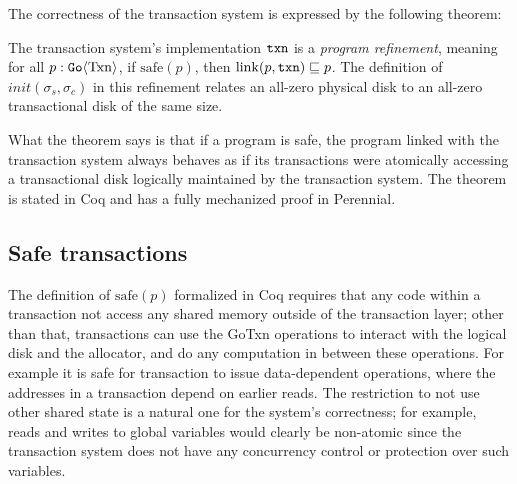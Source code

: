 %

The correctness of the transaction system is expressed by the following theorem:
%
\begin{theorem}
  The transaction system's implementation $\texttt{txn}$ is a \emph{program refinement}, meaning for
  all $p : \mathtt{Go}\langle \mathrm{Txn} \rangle$, if $\mathrm{safe}(p)$, then
  $\mathrm{link}(p, \texttt{txn}) \sqsubseteq p$. The definition of
  $init(\sigma_{s}, \sigma_{c})$ in this refinement relates an all-zero physical
  disk to an all-zero transactional disk of the same size.
  \label{thm:gotxn-program-refinement}
\end{theorem}
%
What the theorem says is that if a program is safe, the program linked with the
transaction system always behaves as if its transactions were atomically
accessing a transactional disk logically maintained by the transaction system.
The theorem is stated in Coq and has a fully mechanized proof in Perennial.

\subsection{Safe transactions}
\label{sec:gotxn:safe}

The definition of $\mathrm{safe}(p)$ formalized in Coq requires that any code
within a transaction not access any shared memory outside of the transaction
layer; other than that, transactions can use the GoTxn operations to interact
with the logical disk and the allocator, and do any computation in between these
operations. For example it is safe for transaction to issue data-dependent
operations, where the addresses in a transaction depend on earlier reads. The
restriction to not use other shared state is a natural one for the system's
correctness; for example, reads and writes to global variables would clearly be
non-atomic since the transaction system does not have any concurrency control or
protection over such variables.

